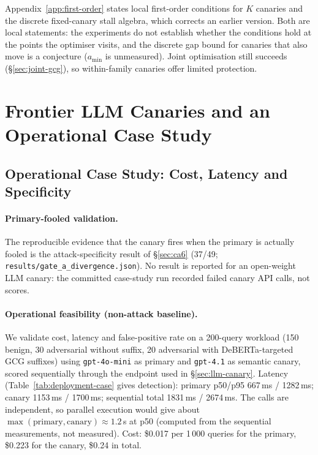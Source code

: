 \documentclass{article}
\begin{document}
Appendix~\ref{app:first-order} states local first-order conditions for $K$ canaries and the discrete fixed-canary stall algebra, which corrects an earlier version. Both are local statements: the experiments do not establish whether the conditions hold at the points the optimiser visits, and the discrete gap bound for canaries that also move is a conjecture ($a_{\min}$ is unmeasured). Joint optimisation still succeeds (\S\ref{sec:joint-gcg}), so within-family canaries offer limited protection.

\section{Frontier LLM Canaries and an Operational Case Study}
\label{sec:llm-eval}

\subsection{Operational Case Study: Cost, Latency and Specificity}
\label{sec:deployment-casestudy}

\paragraph{Primary-fooled validation.} The reproducible evidence that the canary fires when the primary is actually fooled is the attack-specificity result of \S\ref{sec:ca6} (37/49; \texttt{results/gate\_a\_divergence.json}). No result is reported for an open-weight LLM canary: the committed case-study run recorded failed canary API calls, not scores.

\paragraph{Operational feasibility (non-attack baseline).} We validate cost, latency and false-positive rate on a 200-query workload (150 benign, 30 adversarial without suffix, 20 adversarial with DeBERTa-targeted GCG suffixes) using \texttt{gpt-4o-mini} as primary and \texttt{gpt-4.1} as semantic canary, scored sequentially through the endpoint used in \S\ref{sec:llm-canary}. Latency (Table~\ref{tab:deployment-case} gives detection): primary p50/p95 667\,ms / 1282\,ms; canary 1153\,ms / 1700\,ms; sequential total 1831\,ms / 2674\,ms. The calls are independent, so parallel execution would give about $\max(\text{primary}, \text{canary}) \approx 1.2$\,s at p50 (computed from the sequential measurements, not measured). Cost: \$0.017 per 1\,000 queries for the primary, \$0.223 for the canary, \$0.24 in total.
\end{document}
